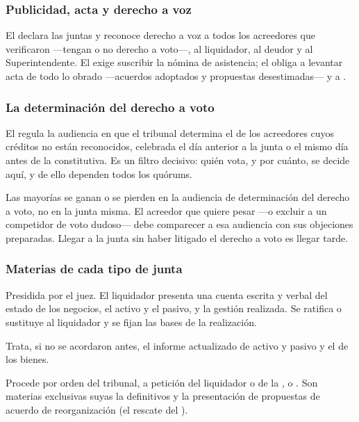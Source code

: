 \subsubsection{Publicidad, acta y derecho a voz}

El  declara las juntas  y reconoce derecho a voz a todos los
acreedores que verificaron ---tengan o no derecho a voto---, al liquidador, al deudor y al
Superintendente. El  exige suscribir la nómina de asistencia; el  obliga a
levantar acta de todo lo obrado ---acuerdos adoptados y propuestas desestimadas--- y a
.

\subsubsection{La determinación del derecho a voto}

El  regula la audiencia en que el tribunal determina el  de
los acreedores cuyos créditos no están reconocidos, celebrada el día anterior a la junta o el
mismo día antes de la constitutiva. Es un filtro decisivo: quién vota, y por cuánto, se decide
aquí, y de ello dependen todos los quórums.

\begin{practica}
Las mayorías se ganan o se pierden en la audiencia de determinación del derecho a voto, no en la
junta misma. El acreedor que quiere pesar ---o excluir a un competidor de voto dudoso--- debe
comparecer a esa audiencia con sus objeciones preparadas. Llegar a la junta sin haber litigado el
derecho a voto es llegar tarde.
\end{practica}

\subsubsection{Materias de cada tipo de junta}

\begin{description}[leftmargin=0pt,style=nextline,font=\sffamily\bfseries]
  \item[Junta Constitutiva (\art{196}-\art{197})] Presidida por el juez. El liquidador presenta
  una cuenta escrita y verbal del estado de los negocios, el activo y el pasivo, y la gestión
  realizada. Se ratifica o sustituye al liquidador y se fijan las bases de la realización.
  \item[Primera Junta Ordinaria (\art{198})] Trata, si no se acordaron antes, el informe
  actualizado de activo y pasivo y el  de los bienes.
  \item[Junta Extraordinaria (\art{199}-\art{200})] Procede por orden del tribunal, a petición
  del liquidador o de la \superir{}, o . Son materias exclusivas suyas la
   definitivos y la presentación de propuestas de
  acuerdo de reorganización (el rescate del ).
\end{description}

